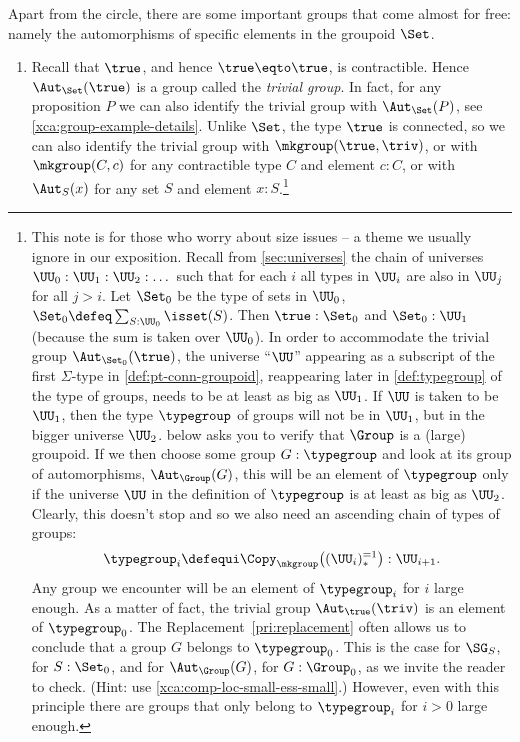 \begin{example}\label{ex:groups}
  Apart from the circle, there are some important groups that come 
  almost for free: namely the automorphisms of specific elements
  in the groupoid $\Set$.
  \begin{enumerate}
  \item\label{ex:trivgroup}
  Recall that $\true$, and hence $\true \eqto \true$, is contractible.
  Hence $\Aut_{\Set}(\true)$ is a group called the 
  \emph{trivial group}. 
  In fact, for any proposition $P$ we can also identify the trivial group 
  with $\Aut_{\Set}(P)$, see \cref{xca:group-example-details}. 
  Unlike $\Set$, the type $\true$ is connected,
  so we can also identify the trivial group with
  $\mkgroup (\true,\triv)$, or with $\mkgroup (C,c)$ for
  any contractible type $C$ and element $c:C$, or
  with $\Aut_{S}(x)$ for any set $S$ and element $x:S$.\footnote{%
This note is for those who worry about size issues -- a
theme we usually ignore in our exposition. 
Recall from \cref{sec:universes} the chain of
universes $\UU_0 : \UU_1 : \UU_2 : \dots$ such that for each $i$
all types in $\UU_i$ are also in $\UU_j$ for all $j>i$.
Let $\Set_0$ be the type of sets in $\UU_0$, 
\ie $\Set_0\defeq \sum_{S:\UU_0}\isset(S)$. Then $\true:\Set_0$ 
and $\Set_0 : \UU_1$ (because the sum is taken over $\UU_0$).
In order to accommodate the trivial group $\Aut_{\Set_0}(\true)$, 
the universe ``$\UU$'' appearing as a subscript of the first 
$\Sigma$-type in \cref{def:pt-conn-groupoid}, reappearing later in 
\cref{def:typegroup} of the type of groups,
needs to be at least as big as $\UU_1$. 
If $\UU$ is taken to be $\UU_1$, then the type $\typegroup$ of groups 
will not be in $\UU_1$, but in the bigger universe $\UU_2$.
 below asks you to verify that $\Group$
is a (large) groupoid. If we then choose some group $G:\typegroup$
and look at its group of automorphisms, $\Aut_\Group(G)$,
this will be an element of $\typegroup$ only if the universe $\UU$ in the
definition of $\typegroup$ is at least as big as $\UU_2$. Clearly, 
this doesn't stop and so we also need an ascending chain of types of groups:
  \[
    \typegroup_i \defequi \Copy_{\mkgroup}\bigl( (\UU_i)_*^{=1} \bigr) : \UU_{i+1}.
  \]
Any group we encounter will be an element of $\typegroup_i$ for $i$
large enough. As a matter of fact, the trivial group $\Aut_{\true}(\triv)$
is an element of $\typegroup_0$. The Replacement~\cref{pri:replacement}
often allows us to conclude that a group $G$ belongs to $\typegroup_0$.
This is the case for $\SG_S$, for $S:\Set_0$, and for $\Aut_\Group(G)$,
for $G:\Group_0$, as we invite the reader to check.
(Hint: use \cref{xca:comp-loc-small-ess-small}.)
However, even with this principle there are groups that only belong
to $\typegroup_i$ for $i>0$ large enough.

}
\end{enumerate}
\end{example}
